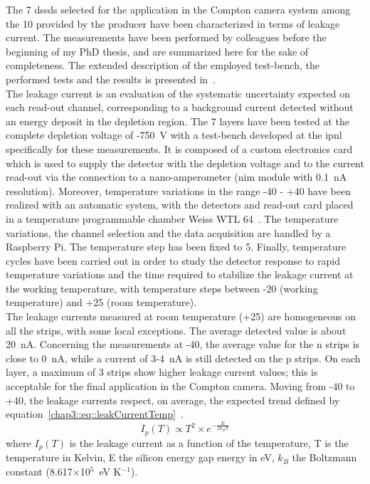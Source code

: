 The 7 \glspl{dssd} selected for the application in the Compton camera system among the 10 provided by the producer have been characterized in terms of leakage current. The measurements have been performed by colleagues before the beginning of my PhD thesis, and are summarized here for the sake of completeness. The extended description of the employed test-bench, the performed tests and the results is presented in~\cite{Ley2015}.\\
The leakage current is an evaluation of the systematic uncertainty expected on each read-out channel, corresponding to a background current detected without an energy deposit in the depletion region. The 7 layers have been tested at the complete depletion voltage of -750~V with a test-bench developed at the \gls{ipnl} specifically for these measurements. It is composed of a custom electronics card which is used to supply the detector with the depletion voltage and to the current read-out via the connection to a nano-amperometer (\gls{nim} module with 0.1~nA resolution).  Moreover, temperature variations in the range -40\textdegree{} - +40\textdegree{} have been realized with an automatic system, with the detectors and read-out card placed in a temperature programmable chamber Weiss WTL 64~\parencite{WeissTechnik2017}. The temperature variations, the channel selection and the data acquisition are handled by a Raspberry Pi. The temperature step has been fixed to 5\textdegree{}. Finally, temperature cycles have been carried out in order to study the detector response to rapid temperature variations and the time required to stabilize the leakage current at the working temperature, with temperature steps between -20\textdegree{} (working temperature) and +25\textdegree{} (room temperature).\\
The leakage currents measured at room temperature (+25\textdegree{}) are homogeneous on all the strips, with some local exceptions. The average detected value is about 20~nA. Concerning the measurements at -40\textdegree{}, the average value for the n strips is close to 0~nA, while a current of 3-4~nA is still detected on the p strips. On each layer, a maximum of 3 strips show higher leakage current values; this is acceptable for the final application in the Compton camera. Moving from -40\textdegree{} to +40\textdegree{}, the leakage currents respect, on average, the expected trend defined by equation~\ref{chap3::eq::leakCurrentTemp}~\parencite{Spieler1998}.\\

\begin{equation}
I_p(T) \propto T^2 \times e^{-\frac{E}{2k_{B}T}}
\label{chap3::eq::leakCurrentTemp}
\end{equation}  
where $I_{p}(T)$ is the leakage current as a function of the temperature, T is the temperature in Kelvin, E the silicon energy gap energy in eV, $k_B$ the Boltzmann constant (8.617$\times$10$^{5}$~eV K$^{-1}$).\\

